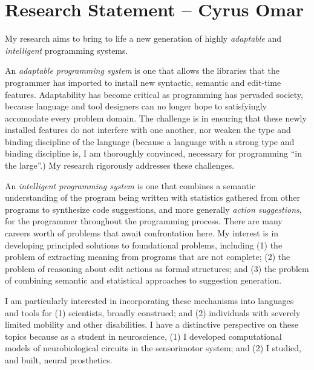 \documentclass[9pt]{extarticle}
\begin{document}
\vspace{-8px}
\section*{Research Statement -- Cyrus Omar}
\vspace{-6px}
My research aims to bring to life a new generation of highly \emph{adaptable} and \emph{intelligent} programming systems.

An \emph{adaptable programming system} is one that allows the libraries that the programmer has imported to install new syntactic, semantic and edit-time features. Adaptability has become critical as programming has pervaded society, because language and tool designers can no longer hope to satisfyingly accomodate every problem domain. The challenge is in ensuring that these newly installed features do not interfere with one another, nor weaken the type and binding discipline of the language (because a language with a strong type and binding discipline is, I am thoroughly convinced, necessary for programming ``in the large''.) My research rigorously addresses these challenges.  %

An \emph{intelligent programming system} is one that combines a semantic understanding of the program being written with statistics gathered from other programs to synthesize code suggestions, and more generally \emph{action suggestions}, for the programmer throughout the programming process. There are many careers worth of problems that await confrontation here. My interest is in developing principled solutions to foundational problems, including (1) the problem of extracting meaning from programs that are not complete; (2) the problem of reasoning about edit actions as formal structures; and (3) the problem of combining semantic and statistical approaches to suggestion generation.

I am particularly interested in incorporating these mechanisms into languages and tools for (1) scientists, broadly construed; and (2) individuals with severely limited mobility and other disabilities. I have a distinctive perspective on these topics because as a student in neuroscience, (1) I developed computational models of neurobiological circuits in the sensorimotor system; and (2) I studied, and built, neural prosthetics.
\end{document}
